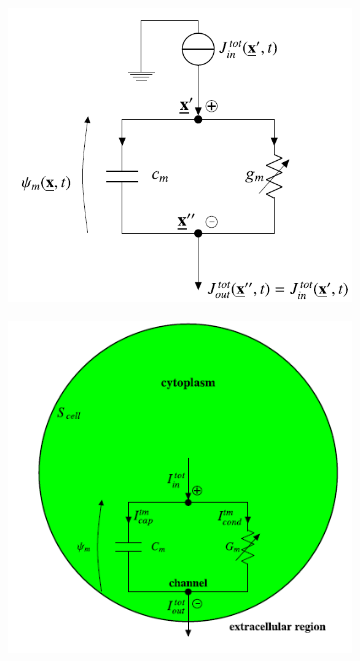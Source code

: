 \documentclass[12pt, a4paper]{article}
\begin{document}
\begin{figure}[H]
	\begin{minipage}{\linewidth}
		\centering
		\begin{minipage}{0.45\linewidth}
			\begin{figure}[H]
				\includegraphics[width=\linewidth]{ode_circuit.png}
				
			\end{figure}
		\end{minipage}
		\hspace{0.05\linewidth}
		\begin{minipage}{0.48\linewidth}
			\begin{figure}[H]
				\includegraphics[width=\linewidth]{global_circuit.png}
				

\end{figure}
\end{minipage}
\end{minipage}
\end{figure}
\end{document}
